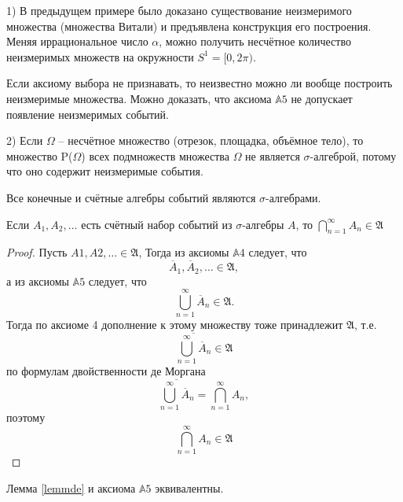\begin{zam}
1) В предыдущем примере было доказано существование неизмеримого множества (множества Витали) и предъявлена конструкция его построения. Меняя иррациональное число $\alpha$, можно получить несчётное количество неизмеримых множеств на окружности $S^1 = [0, 2\pi)$. 

Если аксиому выбора не признавать, то неизвестно можно ли вообще построить неизмеримые множества. Можно доказать, что аксиома $\mathbb{A}5$ не допускает появление неизмеримых событий.


2) Если $\Omega$ -- несчётное множество (отрезок, площадка, объёмное тело), то множество P($\Omega$) всех подмножеств множества $\Omega$ не является $\sigma$-алгеброй, потому что оно содержит неизмеримые события.
\end{zam}

\begin{zam}
Все конечные и счётные алгебры событий являются $\sigma$-алгебрами.
\end{zam}

\begin{lemma}\label{lemmde}
Если ${A_1 , A_2 , \ldots }$ есть счётный набор событий из $\sigma$-алгебры $A$, то $\bigcap\limits_{n=1}^\infty A_n\in\mathfrak{A}$
\end{lemma}
\begin{proof}
Пусть $A1 , A2 , \ldots \in \mathfrak{A}$, Тогда из аксиомы $\mathbb{A}4$ следует, что
\begin{equation*}
	\overline{A}_1,\overline{A}_2, \ldots \in \mathfrak{A},
\end{equation*}
а из аксиомы $\mathbb{A}5$ следует, что
\begin{equation*}
	\bigcup\limits_{n=1}^\infty \overline{A}_n\in\mathfrak{A}.
\end{equation*} 
Тогда по аксиоме 4 дополнение к этому множеству тоже принадлежит $\mathfrak{A}$, т.е. 
\begin{equation*}
	\overline{\bigcup\limits_{n=1}^\infty \overline{A}_n}\in\mathfrak{A}
\end{equation*}
по формулам двойственности де Моргана
\begin{equation*}
	\overline{\bigcup\limits_{n=1}^\infty \overline{A}_n}=\bigcap\limits_{n=1}^\infty {A}_n,
\end{equation*} 
поэтому
\begin{equation*}
	\bigcap\limits_{n=1}^\infty {A}_n\in\mathfrak{A}
\end{equation*}

\end{proof}
\begin{consq}
	Лемма \ref{lemmde} и аксиома $\mathbb{A}5$ эквивалентны.
\end{consq}